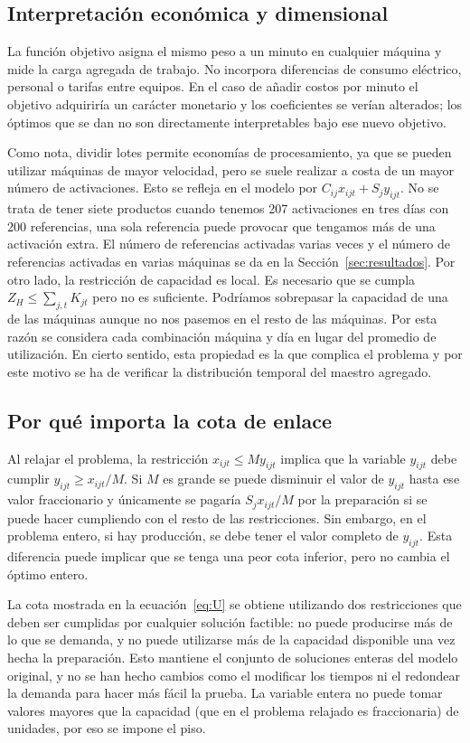 \subsection{Interpretación económica y dimensional}
La función objetivo asigna el mismo peso a un minuto en cualquier máquina y mide la carga agregada de trabajo. No incorpora diferencias de consumo eléctrico, personal o tarifas entre equipos. En el caso de añadir costos por minuto el objetivo adquiriría un carácter monetario y los coeficientes se verían alterados; los óptimos que se dan no son directamente interpretables bajo ese nuevo objetivo.

Como nota, dividir lotes permite economías de procesamiento, ya que se pueden utilizar máquinas de mayor velocidad, pero se suele realizar a costa de un mayor número de activaciones. Esto se refleja en el modelo por $C_{ij}x_{ijt}+S_jy_{ijt}$. No se trata de tener siete productos cuando tenemos 207 activaciones en tres días con 200 referencias, una sola referencia puede provocar que tengamos más de una activación extra. El número de referencias activadas varias veces y el número de referencias activadas en varias máquinas se da en la Sección~\ref{sec:resultados}.
Por otro lado, la restricción de capacidad es local. Es necesario que se cumpla $Z_H\leq\sum_{j,t}K_{jt}$ pero no es suficiente. Podríamos sobrepasar la capacidad de una de las máquinas aunque no nos pasemos en el resto de las máquinas. Por esta razón se considera cada combinación máquina y día en lugar del promedio de utilización. En cierto sentido, esta propiedad es la que complica el problema y por este motivo se ha de verificar la distribución temporal del maestro agregado.

\subsection{Por qué importa la cota de enlace}
Al relajar el problema, la restricción $x_{ijt}\leq M y_{ijt}$ implica que la variable $y_{ijt}$ debe cumplir $y_{ijt}\geq x_{ijt}/M$. Si $M$ es grande se puede disminuir el valor de $y_{ijt}$ hasta ese valor fraccionario y únicamente se pagaría $S_jx_{ijt}/M$ por la preparación si se puede hacer cumpliendo con el resto de las restricciones. Sin embargo, en el problema entero, si hay producción, se debe tener el valor completo de $y_{ijt}$. Esta diferencia puede implicar que se tenga una peor cota inferior, pero no cambia el óptimo entero.

La cota mostrada en la ecuación~\eqref{eq:U} se obtiene utilizando dos restricciones que deben ser cumplidas por cualquier solución factible: no puede producirse más de lo que se demanda, y no puede utilizarse más de la capacidad disponible una vez hecha la preparación. Esto mantiene el conjunto de soluciones enteras del modelo original, y no se han hecho cambios como el modificar los tiempos ni el redondear la demanda para hacer más fácil la prueba. La variable entera no puede tomar valores mayores que la capacidad (que en el problema relajado es fraccionaria) de unidades, por eso se impone el piso.

